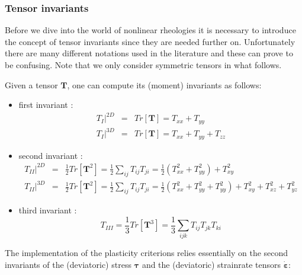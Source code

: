 
\subsubsection{Tensor invariants}

Before we dive into the world of nonlinear rheologies it is necessary to introduce the concept of tensor 
invariants since they are needed further on. 
Unfortunately there are many different notations used in the literature and these can prove to be 
confusing. Note that we only consider symmetric tensors in what follows.

Given a tensor $\bm{T}$,  one can compute its (moment) invariants as follows:
\begin{itemize}
\item first invariant : 
\begin{eqnarray}
T_I|^{2D} &=& Tr[\bm{T}] = T_{xx} + T_{yy} \nonumber\\
T_I|^{3D} &=& Tr[\bm{T}] = T_{xx} + T_{yy} + T_{zz} \nonumber
\end{eqnarray}
\item second invariant :
\begin{eqnarray}
T_{II}|^{2D} &=& \frac{1}{2} Tr[{\bm{T}^2}] = \frac{1}{2} \sum_{ij} T_{ij} T_{ji} = \frac{1}{2} (T_{xx}^2 + T_{yy}^2) + T_{xy}^2 \nonumber\\
T_{II}|^{3D} &=& \frac{1}{2} Tr[{\bm{T}^2}] = \frac{1}{2} \sum_{ij} T_{ij} T_{ji} = \frac{1}{2} (T_{xx}^2 + T_{yy}^2 + T_{yy}^2) + T_{xy}^2 + T_{xz}^2 + T_{yz}^2 \nonumber
\end{eqnarray}
\item third invariant : 
\[
T_{III} = \frac{1}{3} Tr[{\bm{T}^3}]  = \frac{1}{3}\sum_{ijk} T_{ij} T_{jk} T_{ki} 
\]
\end{itemize}


The implementation of the plasticity criterions relies essentially 
on the second invariants of the (deviatoric) stress ${\bm \tau}$ and the (deviatoric) strainrate tensors $\dot{\bm \varepsilon}$:

